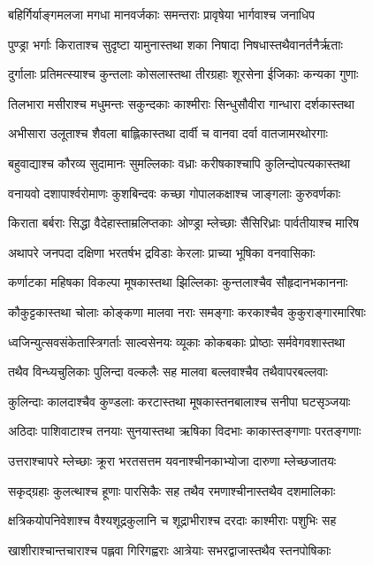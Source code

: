 \twolineshloka
{बहिर्गिर्याङ्गमलजा मगधा मानवर्जकाः}
{समन्तराः प्रावृषेया भार्गवाश्च जनाधिप}


\twolineshloka
{पुण्ड्रा भर्गाः किराताश्च सुदृष्टा यामुनास्तथा}
{शका निषादा निषधास्तथैवानर्तनैर्ऋताः}


\twolineshloka
{दुर्गालाः प्रतिमत्स्याश्च कुन्तलाः कोसलास्तथा}
{तीरग्रहाः शूरसेना ईजिकाः कन्यका गुणाः}


\twolineshloka
{तिलभारा मसीराश्च मधुमन्तः सकुन्दकाः}
{काश्मीराः सिन्धुसौवीरा गान्धारा दर्शकास्तथा}


\twolineshloka
{अभीसारा उलूताश्च शैवला बाह्लिकास्तथा}
{दार्वी च वानवा दर्वा वातजामरथोरगाः}


\twolineshloka
{बहुवाद्याश्च कौरव्य सुदामानः सुमल्लिकाः}
{वध्राः करीषकाश्चापि कुलिन्दोपत्यकास्तथा}


\twolineshloka
{वनायवो दशापार्श्वरोमाणः कुशबिन्दवः}
{कच्छा गोपालकक्षाश्च जाङ्गलाः कुरुवर्णकाः}


\twolineshloka
{किराता बर्बराः सिद्धा वैदेहास्ताम्रलिप्तकाः}
{ओण्ड्रा म्लेच्छाः सैसिरिध्राः पार्वतीयाश्च मारिष}


\twolineshloka
{अथापरे जनपदा दक्षिणा भरतर्षभ}
{द्रविडाः केरलाः प्राच्या भूषिका वनवासिकाः}


\twolineshloka
{कर्णाटका महिषका विकल्पा मूषकास्तथा}
{झिल्लिकाः कुन्तलाश्चैव सौहृदानभकाननाः}


\twolineshloka
{कौकुट्टकास्तथा चोलाः कोङ्कणा मालवा नराः}
{समङ्गाः करकाश्चैव कुकुराङ्गारमारिषाः}


\twolineshloka
{ध्वजिन्युत्सवसंकेतास्त्रिगर्ताः साल्वसेनयः}
{व्यूकाः कोकबकाः प्रोष्ठाः सर्मवेगवशास्तथा}


\twolineshloka
{तथैव विन्ध्यचुलिकाः पुलिन्दा वल्कलैः सह}
{मालवा बल्लवाश्चैव तथैवापरबल्लवाः}


\twolineshloka
{कुलिन्दाः कालदाश्चैव कुण्डलाः करटास्तथा}
{मूषकास्तनबालाश्च सनीपा घटसृञ्जयाः}


\twolineshloka
{अठिदाः पाशिवाटाश्च तनयाः सुनयास्तथा}
{ऋषिका विदभाः काकास्तङ्गणाः परतङ्गणाः}


\twolineshloka
{उत्तराश्चापरे म्लेच्छाः क्रूरा भरतसत्तम}
{यवनाश्चीनकाभ्योजा दारुणा म्लेच्छजातयः}


\twolineshloka
{सकृद्ग्रहाः कुलत्थाश्च हूणाः पारसिकैः सह}
{तथैव रमणाश्चीनास्तथैव दशमालिकाः}


\twolineshloka
{क्षत्रिकयोपनिवेशाश्च वैश्यशूद्रकुलानि च}
{शूद्राभीराश्च दरदाः काश्मीराः पशुभिः सह}


\twolineshloka
{खाशीराश्चान्तचाराश्च पह्लवा गिरिगह्वराः}
{आत्रेयाः सभरद्वाजास्तथैव स्तनपोषिकाः}


